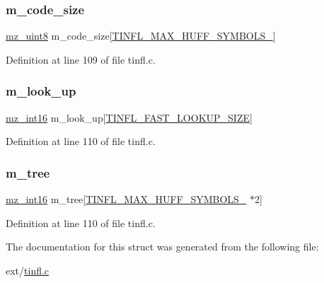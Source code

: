 \subsubsection{\texorpdfstring{m\_code\_size}{m\_code\_size}}
{\footnotesize\ttfamily \mbox{\hyperlink{tinfl_8c_a9354eca32f90733aa9bb3738c92da596}{mz\+\_\+uint8}} m\+\_\+code\+\_\+size\mbox{[}\mbox{\hyperlink{tinfl_8c_adf764cbdea00d65edcd07bb9953ad2b7abc60f0bf72551ed7cbbf1ed9b20752ba}{T\+I\+N\+F\+L\+\_\+\+M\+A\+X\+\_\+\+H\+U\+F\+F\+\_\+\+S\+Y\+M\+B\+O\+L\+S\+\_}}\mbox{]}}



Definition at line 109 of file tinfl.\+c.

\mbox{\label{structtinfl__huff__table_a6aae70a358ad8ca883a5e79e3331389d}} 
\subsubsection{\texorpdfstring{m\_look\_up}{m\_look\_up}}
{\footnotesize\ttfamily \mbox{\hyperlink{tinfl_8c_a5a94836eff2f4841bcdd2eb4ea3b8cc4}{mz\+\_\+int16}} m\+\_\+look\+\_\+up\mbox{[}\mbox{\hyperlink{tinfl_8c_adf764cbdea00d65edcd07bb9953ad2b7a650112828c38f327bd914ec150855c87}{T\+I\+N\+F\+L\+\_\+\+F\+A\+S\+T\+\_\+\+L\+O\+O\+K\+U\+P\+\_\+\+S\+I\+ZE}}\mbox{]}}



Definition at line 110 of file tinfl.\+c.

\mbox{\label{structtinfl__huff__table_a3efb91b83b75d4b4792bee6111d80cb9}} 
\subsubsection{\texorpdfstring{m\_tree}{m\_tree}}
{\footnotesize\ttfamily \mbox{\hyperlink{tinfl_8c_a5a94836eff2f4841bcdd2eb4ea3b8cc4}{mz\+\_\+int16}} m\+\_\+tree\mbox{[}\mbox{\hyperlink{tinfl_8c_adf764cbdea00d65edcd07bb9953ad2b7abc60f0bf72551ed7cbbf1ed9b20752ba}{T\+I\+N\+F\+L\+\_\+\+M\+A\+X\+\_\+\+H\+U\+F\+F\+\_\+\+S\+Y\+M\+B\+O\+L\+S\+\_}} $\ast$2\mbox{]}}



Definition at line 110 of file tinfl.\+c.



The documentation for this struct was generated from the following file\+:\begin{DoxyCompactItemize}
\item 
ext/\mbox{\hyperlink{tinfl_8c}{tinfl.\+c}}\end{DoxyCompactItemize}
